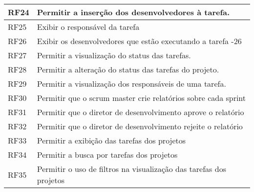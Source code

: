 \begin{table}[H]
\begin{tabular}{|l|l|}
            RF24 & Permitir a inserção dos desenvolvedores à tarefa.                                                                                                     \\ \hline
            RF25 & Exibir o responsável da tarefa                                                                                                                        \\ \hline
            RF26 & Exibir os desenvolvedores que estão executando a tarefa -26                                                                                           \\ \hline
            RF27 & Permitir a visualização do status das tarefas.                                                                                                        \\ \hline
            RF28 & Permitir a alteração do status das tarefas do projeto.                                                                                                \\ \hline
            RF29 & Permitir a visualização dos responsáveis de uma tarefa.                                                                                               \\ \hline
            RF30 & Permitir que o scrum master crie relatórios sobre cada sprint                                                                                         \\ \hline
            RF31 & Permitir que o diretor de desenvolvimento aprove o relatório                                                                                          \\ \hline
            RF32 & Permitir que o diretor de desenvolvimento rejeite o relatório                                                                                         \\ \hline
            RF33 & Permitir a exibição das tarefas dos projetos                                                                                                          \\ \hline
            RF34 & Permitir a busca por tarefas dos projetos                                                                                                             \\ \hline
            RF35 & Permitir o uso de filtros na visualização das tarefas dos projetos                                                                                    \\ \hline
        \end{tabular}
    \end{table}